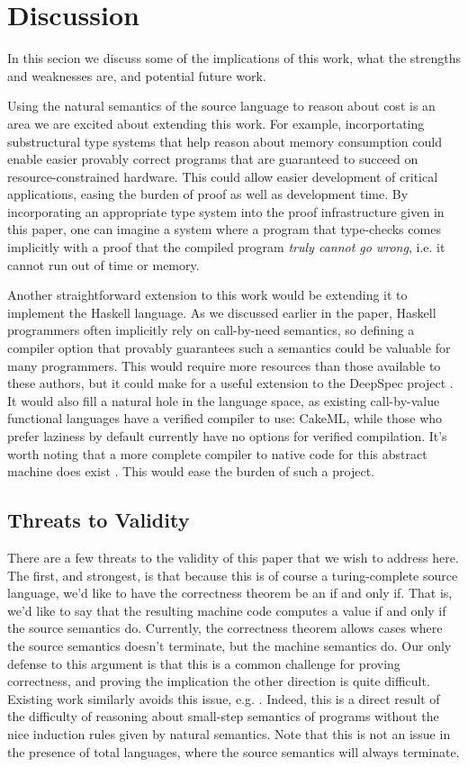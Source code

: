 \section{Discussion}
In this secion we discuss some of the implications of this work, what the strengths
and weaknesses are, and potential future work. 

Using the natural semantics of the source language to reason about cost is an area
we are excited about extending this work. For example, incorportating substructural
type systems that help reason about memory consumption could enable easier provably
correct programs that are guaranteed to succeed on resource-constrained hardware. This
could allow easier development of critical applications, easing the burden of proof as 
well as development time. By incorporating an appropriate type system into the
proof infrastructure given in this paper, one can imagine a system where a
program that type-checks comes implicitly with a proof that the compiled
program \emph{truly cannot go wrong}, i.e. it cannot run out of time or memory. 

Another straightforward extension to this work would be extending it to implement the
Haskell language. As we discussed earlier in the paper, Haskell programmers
often implicitly rely on call-by-need semantics, so defining a compiler option
that provably guarantees such a semantics could be valuable for many programmers. This
would require more resources than those available to these authors, but it could make
for a useful extension to the DeepSpec project \cite{}. It would also fill a natural hole
in the language space, as existing call-by-value functional languages have a verified 
compiler to use: CakeML, while those who prefer laziness by default currently have no
options for verified compilation. It's worth noting that a more complete
compiler to native code for this abstract machine does exist \cite{cem}. This
would ease the burden of such a project. 

\subsection{Threats to Validity} 
There are a few threats to the validity of this paper that we wish to address
here. The first, and strongest, is that because this is of course a
turing-complete source language, we'd like to have the correctness theorem be
an if and only if. That is, we'd like to say that the resulting machine code
computes a value if and only if the source semantics do. Currently, the
correctness theorem allows cases where the source semantics doesn't terminate,
but the machine semantics do. Our only defense to this argument is that this is 
a common challenge for proving correctness, and proving the implication the
other direction is quite difficult. Existing work similarly avoids this issue, e.g. 
\cite{chlipala}. Indeed, this is a direct result of the difficulty of reasoning
about small-step semantics of programs without the nice induction rules given
by natural semantics. Note that this is not an issue in the presence of total
languages, where the source semantics will always terminate.

